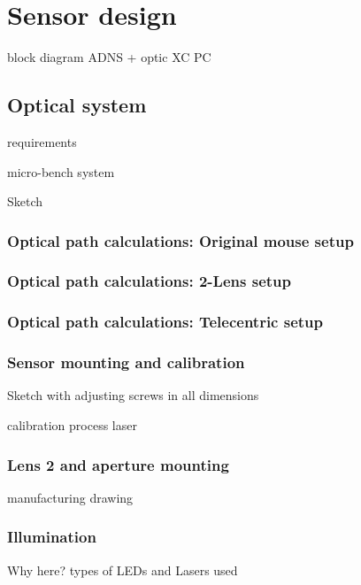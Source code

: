 \documentclass[12pt,a4paper]{article}
\begin{document}

\clearpage
\section{Sensor design}

block diagram
  ADNS + optic
  XC
  PC

\subsection{Optical system}
  requirements

micro-bench system

Sketch

\subsubsection{Optical path calculations: Original mouse setup}

\subsubsection{Optical path calculations: 2-Lens setup}

\subsubsection{Optical path calculations: Telecentric setup}


\subsubsection{Sensor mounting and calibration}

Sketch with adjusting screws in all dimensions

calibration process
  laser

\subsubsection{Lens 2 and aperture mounting}

manufacturing drawing

\subsubsection{Illumination}

  Why here?
  types of LEDs and Lasers used
 
\end{document}

